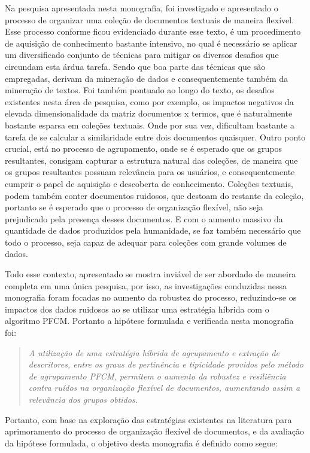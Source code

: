 Na pesquisa apresentada nesta monografia, foi investigado e apresentado o processo de organizar
uma coleção de documentos textuais de maneira flexível. Esse processo conforme ficou evidenciado
durante esse texto, é um procedimento de aquisição de conhecimento bastante intensivo, no qual é
necessário se aplicar um diversificado conjunto de técnicas para mitigar os diversos desafios que
circundam esta árdua tarefa. Sendo que boa parte das técnicas que são empregadas, derivam da
mineração de dados e consequentemente também da mineração de textos. Foi também pontuado ao longo do
texto, os desafios existentes nesta área de pesquisa, como por exemplo, os impactos negativos da
elevada dimensionalidade da matriz documentos x termos, que é naturalmente bastante esparsa em
coleções textuais. Onde por sua vez, dificultam bastante a tarefa de se calcular a similaridade
entre dois documentos quaisquer. Outro ponto crucial, está no processo de agrupamento, onde se é
esperado que os grupos resultantes, consigam capturar a estrutura natural das coleções, de maneira
que os grupos resultantes possuam relevância para os usuários, e consequentemente cumprir o papel
de aquisição e descoberta de conhecimento. Coleções textuais, podem também conter documentos
ruidosos, que destoam do restante da coleção, portanto se é esperado que o processo de organização
flexível, não seja prejudicado pela presença desses documentos. E com o aumento massivo da
quantidade de dados produzidos pela humanidade, se faz também necessário que todo o processo, seja
capaz de adequar para coleções com grande volumes de dados.

Todo esse contexto, apresentado se mostra inviável de ser abordado de maneira completa em uma única
pesquisa, por isso, as investigações conduzidas nessa monografia foram focadas no aumento da
robustez do processo, reduzindo-se os impactos dos dados ruidosos ao se utilizar uma estratégia
híbrida com o algoritmo PFCM. Portanto a hipótese formulada e verificada nesta monografia foi:

\begin{quote}
\textit{A utilização de uma estratégia híbrida de agrupamento e extração de descritores, entre os 
  graus de pertinência e tipicidade providos pelo método de agrupamento PFCM, permitem o aumento da
    robustez e resiliência contra ruídos na organização flexível de documentos, aumentando assim a
    relevância dos grupos obtidos.}
\end{quote}

Portanto, com base na exploração das estratégias existentes na literatura para aprimoramento do
processo de organização flexível de documentos, e da avaliação da hipótese formulada, o objetivo
desta monografia é definido como segue:

